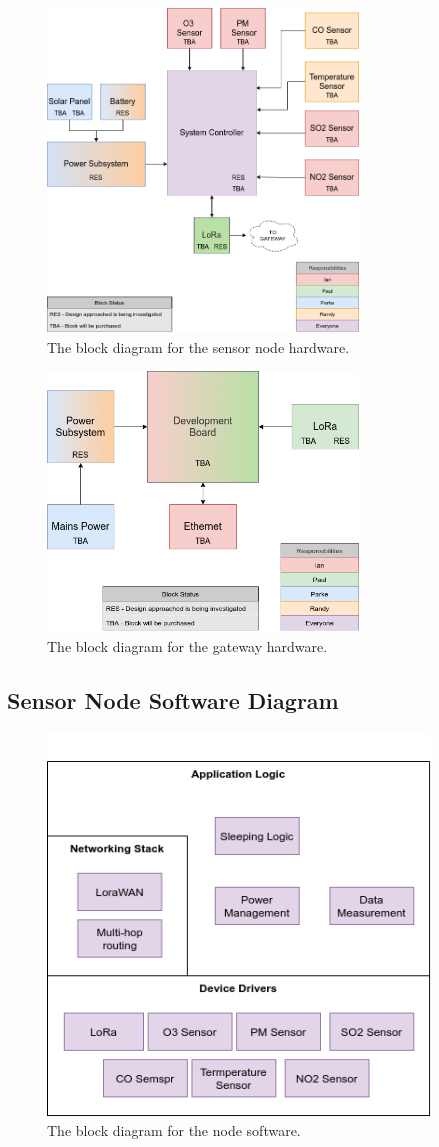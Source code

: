 \begin{figure}[H]
    \centering
    \includegraphics[width=3.25in]{"./figures/hwNodeBD.png"} 
    \caption{The block diagram for the sensor node hardware.}
    \label{fig:hwNodeBD}
\end{figure}

\begin{figure}[H]
    \centering
    \includegraphics[width=3.25in]{"./figures/hwGatewayBD.png"} 
    \caption{The block diagram for the gateway hardware.}
    \label{fig:hwBaseStationBD}
\end{figure}

\subsection{Sensor Node Software Diagram}
\begin{figure}[H]
    \centering
    \includegraphics[width=4in]{"./figures/swNodeBD.png"} 
    \caption{The block diagram for the node software.}
    \label{fig:swNodeBD}
\end{figure}